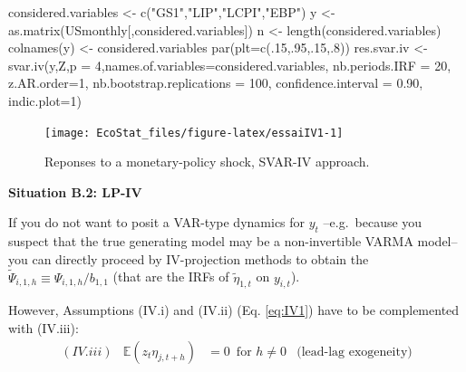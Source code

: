 \documentclass[
  12pt,
]{book}
\newenvironment{Shaded}{\begin{snugshade}}{\end{snugshade}}
\newcommand{\AttributeTok}[1]{\textcolor[rgb]{0.77,0.63,0.00}{#1}}
\newcommand{\DecValTok}[1]{\textcolor[rgb]{0.00,0.00,0.81}{#1}}
\newcommand{\FloatTok}[1]{\textcolor[rgb]{0.00,0.00,0.81}{#1}}
\newcommand{\FunctionTok}[1]{\textcolor[rgb]{0.00,0.00,0.00}{#1}}
\newcommand{\NormalTok}[1]{#1}
\newcommand{\OtherTok}[1]{\textcolor[rgb]{0.56,0.35,0.01}{#1}}
\newcommand{\StringTok}[1]{\textcolor[rgb]{0.31,0.60,0.02}{#1}}
\theoremstyle{definition}
\theoremstyle{definition}
\theoremstyle{definition}
\theoremstyle{definition}
\theoremstyle{remark}
\begin{document}
\begin{Shaded}
\begin{Highlighting}[]
\NormalTok{considered.variables }\OtherTok{\textless{}{-}} \FunctionTok{c}\NormalTok{(}\StringTok{"GS1"}\NormalTok{,}\StringTok{"LIP"}\NormalTok{,}\StringTok{"LCPI"}\NormalTok{,}\StringTok{"EBP"}\NormalTok{)}
\NormalTok{y }\OtherTok{\textless{}{-}} \FunctionTok{as.matrix}\NormalTok{(USmonthly[,considered.variables])}
\NormalTok{n }\OtherTok{\textless{}{-}} \FunctionTok{length}\NormalTok{(considered.variables)}
\FunctionTok{colnames}\NormalTok{(y) }\OtherTok{\textless{}{-}}\NormalTok{ considered.variables}
\FunctionTok{par}\NormalTok{(}\AttributeTok{plt=}\FunctionTok{c}\NormalTok{(.}\DecValTok{15}\NormalTok{,.}\DecValTok{95}\NormalTok{,.}\DecValTok{15}\NormalTok{,.}\DecValTok{8}\NormalTok{))}
\NormalTok{res.svar.iv }\OtherTok{\textless{}{-}} 
  \FunctionTok{svar.iv}\NormalTok{(y,Z,}\AttributeTok{p =} \DecValTok{4}\NormalTok{,}\AttributeTok{names.of.variables=}\NormalTok{considered.variables,}
          \AttributeTok{nb.periods.IRF =} \DecValTok{20}\NormalTok{,}
          \AttributeTok{z.AR.order=}\DecValTok{1}\NormalTok{, }
          \AttributeTok{nb.bootstrap.replications =} \DecValTok{100}\NormalTok{, }
          \AttributeTok{confidence.interval =} \FloatTok{0.90}\NormalTok{,}
          \AttributeTok{indic.plot=}\DecValTok{1}\NormalTok{)}
\end{Highlighting}
\end{Shaded}

\begin{figure}
\texttt{[image: EcoStat\_files/figure-latex/essaiIV1-1]} \caption{Reponses to a monetary-policy shock, SVAR-IV approach.}\label{fig:essaiIV1}
\end{figure}

\textbf{Situation B.2: LP-IV}

If you do not want to posit a VAR-type dynamics for \(y_t\) --e.g.~because you suspect that the true generating model may be a non-invertible VARMA model-- you can directly proceed by IV-projection methods to obtain the \(\tilde\Psi_{i,1,h}\equiv \Psi_{i,1,h}/b_{1,1}\) (that are the IRFs of \(\tilde\eta_{1,t}\) on \(y_{i,t}\)).

However, Assumptions (IV.i) and (IV.ii) (Eq. \eqref{eq:IV1}) have to be complemented with (IV.iii):
\begin{equation*}
\begin{array}{llll}
(IV.iii) & \mathbb{E}(z_t \eta_{j,t+h}) &= 0 \, \mbox{ for } h \ne 0 & \mbox{(lead-lag exogeneity)}
\end{array}
\end{equation*}
\end{document}
